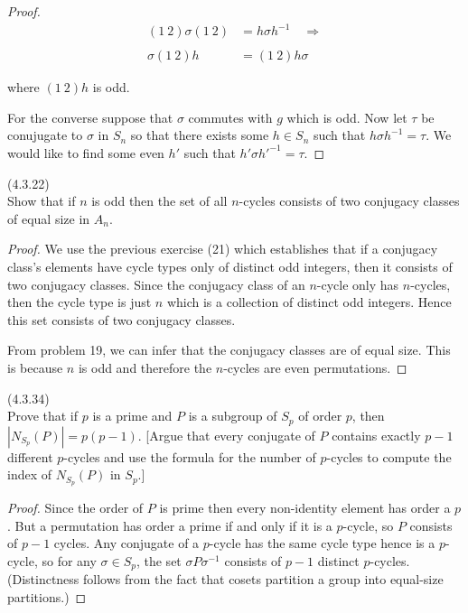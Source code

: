 \documentclass{exam}
\begin{document}
\begin{questions}
\begin{proof}
  \begin{align*}
    (1\ 2)\sigma (1\ 2) &= h\sigma h^{-1} \quad \Rightarrow \\\\
    \sigma(1\ 2)h &= (1\ 2)h\sigma
  \end{align*}

  where $(1\ 2)h$ is odd.

  For the converse suppose that $\sigma$ commutes with $g$ which is odd.  Now let $\tau$ be conujugate to $\sigma$ in $S_n$ so that there exists some $h\in S_n$ such that $h\sigma h^{-1}=\tau$.  We would like to find some even $h'$ such that $h'\sigma h'^{-1}=\tau$.
\end{proof}

\question(4.3.22)\\
Show that if $n$ is odd then the set of all $n$-cycles consists of two conjugacy classes of equal size in $A_n$.

\begin{proof}
  We use the previous exercise (21) which establishes that if a conjugacy class's elements have cycle types only of distinct odd integers, then it consists of two conjugacy classes.  Since the conjugacy class of an $n$-cycle only has $n$-cycles, then the cycle type is just $n$ which is a collection of distinct odd integers.  Hence this set consists of two conjugacy classes.

  From problem 19, we can infer that the conjugacy classes are of equal size.  This is because $n$ is odd and therefore the $n$-cycles are even permutations.
\end{proof}

\question(4.3.34)\\
Prove that if $p$ is a prime and $P$ is a subgroup of $S_p$ of order $p$, then $|N_{S_p}(P)|=p(p-1)$.  [Argue that every conjugate of $P$ contains exactly $p-1$ different $p$-cycles and use the formula for the number of $p$-cycles to compute the index of $N_{S_p}(P)$ in $S_p$.]

\begin{proof}
  Since the order of $P$ is prime then every non-identity element has order a $p$.  But a permutation has order a prime if and only if it is a $p$-cycle, so $P$ consists of $p-1$ cycles.  Any conjugate of a $p$-cycle has the same cycle type hence is a $p$-cycle, so for any $\sigma\in S_p$, the set $\sigma P\sigma^{-1}$ consists of $p-1$ distinct $p$-cycles. (Distinctness follows from the fact that cosets partition a group into equal-size partitions.)


\end{proof}
\end{questions}
\end{document}
